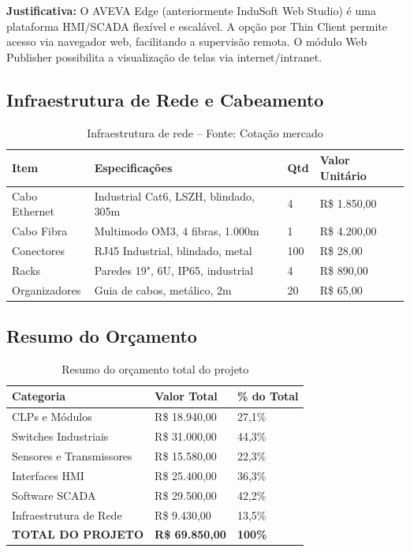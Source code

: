 \documentclass[12pt,a4paper]{article}
\begin{document}
\textbf{Justificativa:} O AVEVA Edge (anteriormente InduSoft Web Studio) é uma plataforma HMI/SCADA flexível e escalável. A opção por Thin Client permite acesso via navegador web, facilitando a supervisão remota. O módulo Web Publisher possibilita a visualização de telas via internet/intranet.

\subsection{Infraestrutura de Rede e Cabeamento}

\begin{table}[h]
\centering
\begin{tabular}{@{}p{3cm}|p{5cm}|p{2cm}|p{3cm}@{}}
\toprule
\textbf{Item} & \textbf{Especificações} & \textbf{Qtd} & \textbf{Valor Unitário} \\
\midrule
Cabo Ethernet & Industrial Cat6, LSZH, blindado, 305m & 4 & R\$ 1.850,00 \\
\midrule
Cabo Fibra & Multimodo OM3, 4 fibras, 1.000m & 1 & R\$ 4.200,00 \\
\midrule
Conectores & RJ45 Industrial, blindado, metal & 100 & R\$ 28,00 \\
\midrule
Racks & Paredes 19", 6U, IP65, industrial & 4 & R\$ 890,00 \\
\midrule
Organizadores & Guia de cabos, metálico, 2m & 20 & R\$ 65,00 \\
\bottomrule
\end{tabular}
\caption{Infraestrutura de rede -- Fonte: Cotação mercado}
\end{table}

\subsection{Resumo do Orçamento}

\begin{table}[h]
\centering
\begin{tabular}{@{}p{6cm}|p{3cm}|p{4cm}@{}}
\toprule
\textbf{Categoria} & \textbf{Valor Total} & \textbf{\% do Total} \\
\midrule
CLPs e Módulos & R\$ 18.940,00 & 27,1\% \\
\midrule
Switches Industriais & R\$ 31.000,00 & 44,3\% \\
\midrule
Sensores e Transmissores & R\$ 15.580,00 & 22,3\% \\
\midrule
Interfaces HMI & R\$ 25.400,00 & 36,3\% \\
\midrule
Software SCADA & R\$ 29.500,00 & 42,2\% \\
\midrule
Infraestrutura de Rede & R\$ 9.430,00 & 13,5\% \\
\midrule
\textbf{TOTAL DO PROJETO} & \textbf{R\$ 69.850,00} & \textbf{100\%} \\
\bottomrule
\end{tabular}
\caption{Resumo do orçamento total do projeto}
\end{table}
\end{document}
